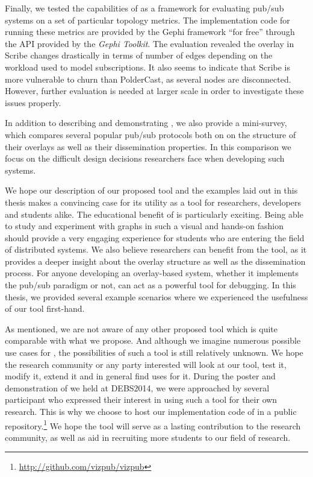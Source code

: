 Finally, we tested the capabilities of \demo{} as a framework for
evaluating pub/sub systems on a set of particular topology metrics. The
implementation code for running these metrics are provided by the Gephi
framework ``for free'' through the API provided by the \emph{Gephi
    Toolkit}. The evaluation revealed the overlay in Scribe changes
drastically in terms of number of edges depending on the workload used
to model subscriptions. It also seems to indicate that Scribe is more
vulnerable to churn than PolderCast, as several nodes are disconnected.
However, further evaluation is needed at larger scale in order to
investigate these issues properly.

In addition to describing and demonstrating \demo{}, we also provide a
mini-survey, which compares several popular pub/sub protocols both on
on the structure of their overlays as well as their dissemination
properties. In this comparison we focus on the difficult design
decisions researchers face when developing such systems.

We hope our description of our proposed tool and the examples laid out
in this thesis makes a convincing case for its utility as a tool for
researchers, developers and students alike. The educational benefit of
\demo{} is particularly exciting. Being able to study and experiment
with graphs in such a visual and hands-on fashion should provide a very
engaging experience for students who are entering the field of
distributed systems. We also believe researchers can benefit from the
tool, as it provides a deeper insight about the overlay structure as
well as the dissemination process. For anyone developing an
overlay-based system, whether it implements the pub/sub paradigm or not,
\demo{} can act as a powerful tool for debugging. In this thesis, we
provided several example scenarios where we experienced the usefulness
of our tool first-hand.

As mentioned, we are not aware of any other proposed tool which is quite
comparable with what we propose. And although we imagine numerous
possible use cases for \demo{}, the possibilities of such a tool is
still relatively unknown. We hope  the research community or any party
interested will look at our tool, test it, modify it, extend it and in
general find uses for it. During the poster and demonstration of \demo{}
we held at DEBS2014, we were approached by several participant who
expressed their interest in using such a tool for their own research.
This is why we choose to host our implementation code of
\demo{} in a public
repository.\footnote{\url{http://github.com/vizpub/vizpub}} We hope the
tool will serve as a lasting contribution to the research community, as well
as aid in recruiting more students to our field of research.

